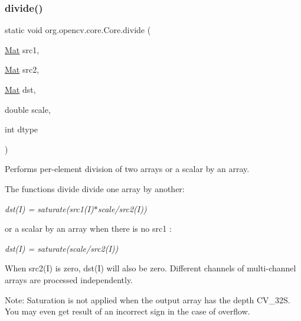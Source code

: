 \subsubsection{\texorpdfstring{divide()}{divide()}\hspace{0.1cm}{\footnotesize\ttfamily [1/8]}}
{\footnotesize\ttfamily static void org.\+opencv.\+core.\+Core.\+divide (\begin{DoxyParamCaption}\item[{\mbox{\hyperlink{classorg_1_1opencv_1_1core_1_1_mat}{Mat}}}]{src1,  }\item[{\mbox{\hyperlink{classorg_1_1opencv_1_1core_1_1_mat}{Mat}}}]{src2,  }\item[{\mbox{\hyperlink{classorg_1_1opencv_1_1core_1_1_mat}{Mat}}}]{dst,  }\item[{double}]{scale,  }\item[{int}]{dtype }\end{DoxyParamCaption})\hspace{0.3cm}{\ttfamily [static]}}

Performs per-\/element division of two arrays or a scalar by an array.

The functions {\ttfamily divide} divide one array by another\+:

{\itshape dst(\+I) = saturate(src1(\+I)$\ast$scale/src2(I))}

or a scalar by an array when there is no {\ttfamily src1} \+:

{\itshape dst(\+I) = saturate(scale/src2(I))}

When {\ttfamily src2(\+I)} is zero, {\ttfamily dst(\+I)} will also be zero. Different channels of multi-\/channel arrays are processed independently.

Note\+: Saturation is not applied when the output array has the depth {\ttfamily C\+V\+\_\+32S}. You may even get result of an incorrect sign in the case of overflow.


